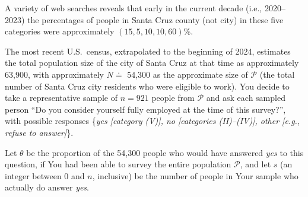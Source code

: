 \documentclass[12pt]{article}
\begin{document}
A variety of web searches reveals that early in the current decade (i.e., 2020--2023) the percentages of people in Santa Cruz county (not city) in these five categories were approximately $( 15, 5, 10, 10, 60 )$\%. 

The most recent U.S.~census, extrapolated to the beginning of 2024, estimates the total population size of the city of Santa Cruz at that time as approximately 63,900, with approximately $N \doteq$ 54,300 as the approximate size of $\mathcal{ P }$ (the total number of Santa Cruz city residents who were eligible to work). You decide to take a representative sample of $n = 921$ people from $\mathcal{ P }$ and ask each sampled person ``Do you consider yourself fully employed at the time of this survey?'', with possible responses \{\textit{yes [category (V)], no [categories (II)--(IV)], other [e.g., refuse to answer]}\}. 

Let $\theta$ be the proportion of the 54,300 people who would have answered \textit{yes} to this question, if You had been able to survey the entire population $\mathcal{ P }$, and let $s$ (an integer between 0 and $n$, inclusive) be the number of people in Your sample who actually do answer \textit{yes}.
\end{document}
